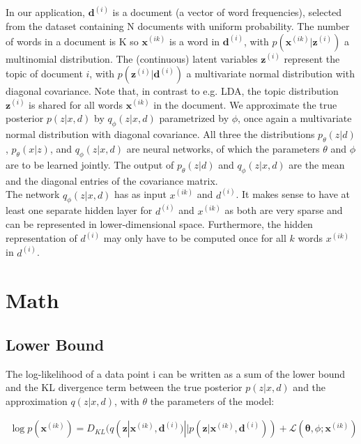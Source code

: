 \documentclass{article}
\begin{document}
In our application, $\mathbf{d}^{(i)}$ is a document (a vector of word frequencies), selected from the dataset containing N documents with uniform probability. The number of words in a document is K so $\mathbf{x}^{(ik)}$ is a word in $\mathbf{d}^{(i)}$, with $p(\mathbf{x}^{(ik)}|\mathbf{z}^{(i)})$ a multinomial distribution. The (continuous) latent variables $\mathbf{z}^{(i)}$ represent the topic of document $i$, with $p(\mathbf{z}^{(i)}|\mathbf{d}^{(i)})$ a multivariate normal distribution with diagonal covariance. Note that, in contrast to e.g. LDA, the topic distribution  $\mathbf{z}^{(i)}$ is shared for all words $\mathbf{x}^{(ik)}$ in the document. 
We approximate the true posterior $p(z|x,d)$ by $q_\phi(z|x,d)$ parametrized by $\phi$, once again a multivariate normal distribution with diagonal covariance. All three the distributions $p_\theta(z|d)$, $p_\theta(x|z)$, and $q_\phi(z|x,d)$ are neural networks, of which the parameters $\theta$ and $\phi$ are to be learned jointly. The output of $p_\theta(z|d)$ and $q_\phi(z|x,d)$ are the mean and the diagonal entries of the covariance matrix.\\ 

The network $q_\phi(z|x,d)$ has as input $x^{(ik)}$ and $d^{(i)}$. It makes sense to have at least one separate hidden layer for $d^{(i)}$ and $x^{(ik)}$ as both are very sparse and can be represented in lower-dimensional space. Furthermore, the hidden representation of $d^{(i)}$ may only have to be computed once for all $k$ words $x^{(ik)}$ in $d^{(i)}$.

\section{Math}

\subsection{Lower Bound}

The log-likelihood of a data point i can be written as a sum of the lower bound and the KL divergence term between the true posterior $p(z|x,d)$ and the approximation $q(z|x,d)$, with $\theta$ the parameters of the model:

\begin{align*}
    \log p(\mathbf{x}^{(ik)}) = D_{KL}(q(\mathbf{z}|\mathbf{x}^{(ik)},\mathbf{d}^{(i)}) || p(\mathbf{z}|\mathbf{x}^{(ik)},\mathbf{d}^{(i)})) + \mathcal{L}(\mathbf{\theta}, \phi; \mathbf{x}^{(ik)})
\end{align*}
\end{document}
